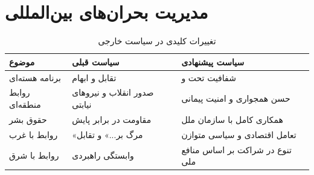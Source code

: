 \section{مدیریت بحران‌های بین‌المللی}

\begin{table}[htbp]
\centering
\caption{تغییرات کلیدی در سیاست خارجی}
\begin{tabular}{R{4cm} R{5cm} R{6cm}}
\hline
\textbf{موضوع} & \textbf{سیاست قبلی} & \textbf{سیاست پیشنهادی} \\
\hline
برنامه هسته‌ای & تقابل و ابهام & شفافیت تحت  و  \\
روابط منطقه‌ای & صدور انقلاب و نیروهای نیابتی & حسن همجواری و امنیت پیمانی \\
حقوق بشر & مقاومت در برابر پایش & همکاری کامل با سازمان ملل \\
روابط با غرب & «مرگ بر...» و تقابل & تعامل اقتصادی و سیاسی متوازن \\
روابط با شرق & وابستگی راهبردی & تنوع در شراکت بر اساس منافع ملی \\
\hline
\end{tabular}
\end{table}
